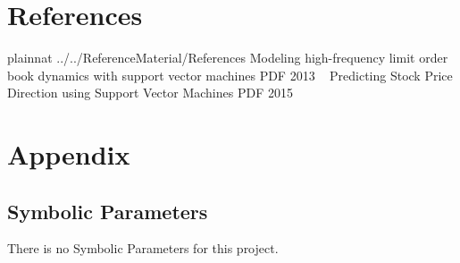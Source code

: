 \documentclass[12pt]{article}
\begin{document}
%
%
%

\newpage
\section{References}
 {plainnat}
 {../../ReferenceMaterial/References}
Modeling high-frequency limit order book dynamics with support vector machines  PDF 2013
~\newline
Predicting Stock Price Direction using Support Vector Machines PDF 2015

\newpage

\section{Appendix}



\subsection{Symbolic Parameters}

There is no Symbolic Parameters for this project.
\end{document}
